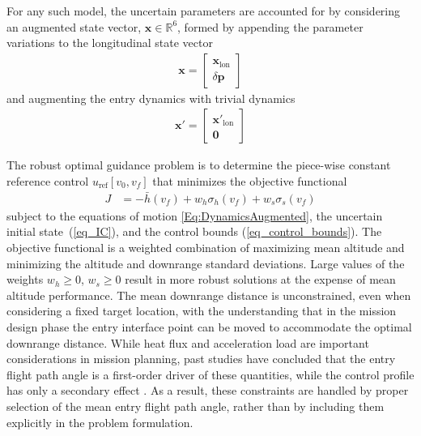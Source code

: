 \documentclass[journal ]{new-aiaa}
\newcommand{\state}{\ensuremath{\mathbf{x}}}
\newcommand{\ur}{\ensuremath{u_{\mathrm{ref}}}}
\newcommand{\param}{\ensuremath{\mathbf{p}}}
\newcommand{\E}[1]{\mathbb{E}\left[#1\right]}
\newcommand{\V}[1]{\mathbb{V}[#1]}
\begin{document}
For any such model, the uncertain parameters are accounted for by considering an augmented state vector, $\state\in \mathbb{R}^{6}$, formed by appending the parameter variations to the longitudinal state vector
\begin{align}
	\state = \left[
	\begin{matrix}
		\state_{\mathrm{lon}} \\
		\delta\param
	\end{matrix}
	\right]
\end{align} 
and augmenting the entry dynamics with trivial dynamics
\begin{align}
	\state' = \left[
	\begin{matrix}
		\state'_{\mathrm{lon}} \\
		\mathbf{0}
	\end{matrix}
	\right]\label{Eq:DynamicsAugmented}
\end{align}

The robust optimal guidance problem is to determine the piece-wise constant reference control $\ur\left[v_0,v_f\right]$ that minimizes the objective functional
\begin{align}
J &= -\bar{h}(v_f) + w_h\sigma_h(v_f) + w_s\sigma_s(v_f) \label{eq_objective}
\end{align}
subject to the equations of motion \eqref{Eq:DynamicsAugmented}, the uncertain initial state~(\ref{eq_IC}), and the control bounds (\ref{eq_control_bounds}). 
The objective functional is a weighted combination of maximizing mean altitude and minimizing the altitude and downrange standard deviations. Large values of the weights $w_h\ge0$, $w_s\ge0$ result in more robust solutions at the expense of mean altitude performance.
The mean downrange distance is unconstrained, even when considering a fixed target location, with the understanding that in the mission design phase the entry interface point can be moved to accommodate the optimal downrange distance. While heat flux and acceleration load are important considerations in mission planning, past studies have concluded that the entry flight path angle is a first-order driver of these quantities, while the control profile has only a secondary effect \cite{MSL_EDL2}. As a result, these constraints are handled by proper selection of the mean entry flight path angle, rather than by including them explicitly in the problem formulation. 
\end{document}
